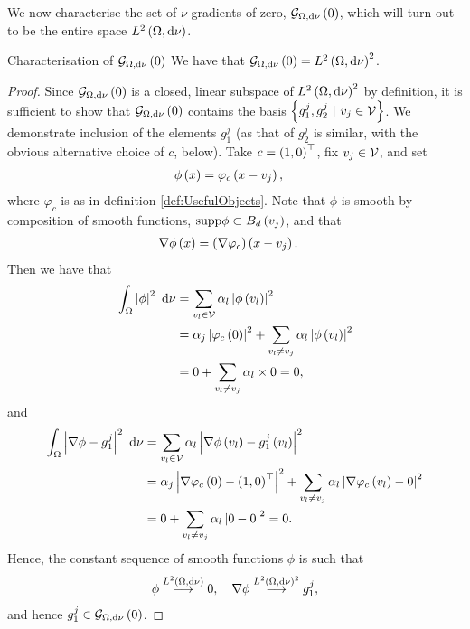 \documentclass[11pt]{report}
\begin{document}
We now characterise the set of $\nu$-gradients of zero, $\mathcal{G}_{ \Omega, \mathrm{d}\nu}\left( 0 \right)$, which will turn out to be the entire space $L^{2}\left( \Omega,\mathrm{d}\nu \right)$.
\begin{prop}{Characterisation of $\mathcal{G}_{ \Omega, \mathrm{d}\nu}\left( 0 \right)$} \label{prop:CharPointMassGradZero}
	We have that $\mathcal{G}_{ \Omega, \mathrm{d}\nu}\left( 0 \right) = L^{2}\left( \Omega,\mathrm{d}\nu \right)^2$.
\end{prop}
\begin{proof}
	Since $\mathcal{G}_{ \Omega, \mathrm{d}\nu}\left( 0 \right)$ is a closed, linear subspace of $L^{2}\left( \Omega,\mathrm{d}\nu \right)^2$ by definition, it is sufficient to show that $\mathcal{G}_{ \Omega, \mathrm{d}\nu}\left( 0 \right)$ contains the basis $\clbracs{g_1^j, g_2^j \ \vert \ v_j\in\vertSet}$.
	We demonstrate inclusion of the elements $g^j_1$ (as that of $g^j_2$ is similar, with the obvious alternative choice of $c$, below).
	Take $c=\left( 1,0 \right)^{\top}$, fix $v_j\in\mathcal{V}$, and set
	\begin{align*}
		\phi\left( x \right) &= \varphi_c\left( x-v_j \right),
	\end{align*}
	where $\varphi_c$ is as in definition \ref{def:UsefulObjects}.
	Note that $\phi$ is smooth by composition of smooth functions, $\mathrm{supp}\phi\subset B_{d}\left( v_j \right)$, and that
	\begin{align*}
		\nabla\phi\left( x \right) &= \left( \nabla\varphi_c \right)\left( x-v_j \right).
	\end{align*}
	Then we have that
	\begin{align*}
		\int_{\Omega}\left\lvert \phi \right\rvert^2 \ \mathrm{d}\nu &= \sum_{v_l\in\mathcal{V}} \alpha_l\left\lvert \phi\left( v_l \right) \right\rvert^2 \\
		&= \alpha_j\left\lvert \varphi_c\left( 0 \right) \right\rvert^2 + \sum_{v_l\neq v_j}\alpha_l\left\lvert \phi\left( v_l \right) \right\rvert^2 \\
		&= 0 + \sum_{v_l\neq v_j} \alpha_l \times 0 = 0,
	\end{align*}
	and
	\begin{align*}
		\int_{\Omega}\left\lvert \nabla\phi - g^j_1 \right\rvert^2 \ \mathrm{d}\nu &= \sum_{v_l\in\mathcal{V}} \alpha_l\left\lvert \nabla\phi\left( v_l \right) - g^j_1\left( v_l \right) \right\rvert^2 \\
		&= \alpha_j\left\lvert \nabla\varphi_c\left( 0 \right) - \left( 1,0 \right)^{\top} \right\rvert^2 + \sum_{v_l\neq v_j} \alpha_l\left\lvert \nabla\varphi_c\left( v_l \right) - 0 \right\rvert^2 \\
		&= 0 + \sum_{v_l\neq v_j} \alpha_l\left\lvert 0 - 0 \right\rvert^2 = 0.
	\end{align*}
	Hence, the constant sequence of smooth functions $\phi$ is such that
	\begin{align*}
		\phi\overset{L^{2}\left( \Omega,\mathrm{d}\nu \right)}{\longrightarrow}0, \quad \nabla\phi\overset{L^{2}\left( \Omega,\mathrm{d}\nu \right)^2}{\longrightarrow} g^j_1,
	\end{align*}
	and hence $g^j_1\in\mathcal{G}_{ \Omega, \mathrm{d}\nu}\left( 0 \right)$.
\end{proof}
\end{document}
